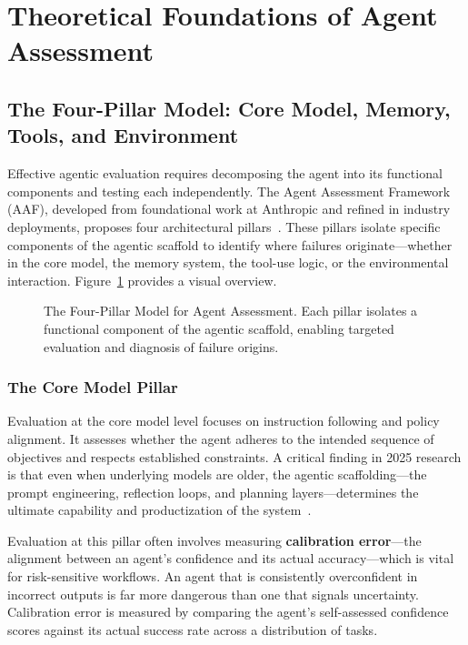 \documentclass[11pt]{article}
\newcommand{\keyword}[1]{\textbf{#1}}
\begin{document}
\section{Theoretical Foundations of Agent Assessment}
\label{sec:foundations}

\subsection{The Four-Pillar Model: Core Model, Memory, Tools, and Environment}

Effective agentic evaluation requires decomposing the agent into its functional components and testing each independently. The Agent Assessment Framework (AAF), developed from foundational work at Anthropic and refined in industry deployments, proposes four architectural pillars~\citep{beyond_task_completion}. These pillars isolate specific components of the agentic scaffold to identify where failures originate---whether in the core model, the memory system, the tool-use logic, or the environmental interaction. Figure~\ref{fig:pillar_model} provides a visual overview.

\begin{figure}[htbp]
\centering

\caption{The Four-Pillar Model for Agent Assessment. Each pillar isolates a functional component of the agentic scaffold, enabling targeted evaluation and diagnosis of failure origins.}
\label{fig:pillar_model}
\end{figure}

\subsubsection{The Core Model Pillar}

Evaluation at the core model level focuses on instruction following and policy alignment. It assesses whether the agent adheres to the intended sequence of objectives and respects established constraints. A critical finding in 2025 research is that even when underlying models are older, the agentic scaffolding---the prompt engineering, reflection loops, and planning layers---determines the ultimate capability and productization of the system~\citep{beyond_task_completion}.

Evaluation at this pillar often involves measuring \keyword{calibration error}---the alignment between an agent's confidence and its actual accuracy---which is vital for risk-sensitive workflows. An agent that is consistently overconfident in incorrect outputs is far more dangerous than one that signals uncertainty. Calibration error is measured by comparing the agent's self-assessed confidence scores against its actual success rate across a distribution of tasks.
\end{document}
